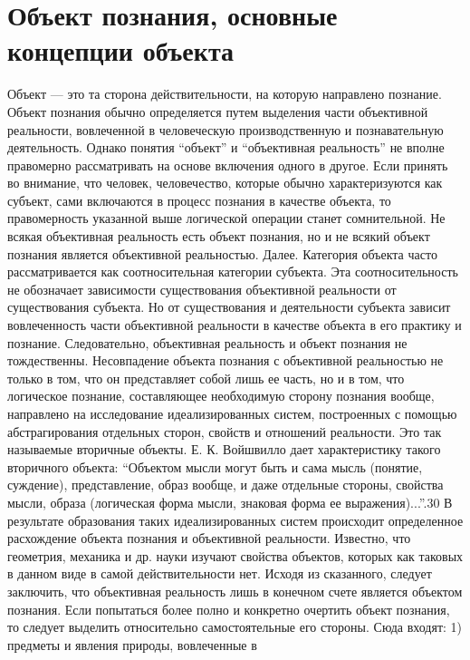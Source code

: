 \documentclass[12pt]{article}
\begin{document}
\newpage
\section{Объект познания, основные концепции объекта}
Объект — это та сторона действительности, на которую направлено познание.
Объект  познания  обычно  определяется  путем  выделения  части  объективной  реальности,  вовлеченной  в
человеческую производственную и познавательную деятельность. Однако понятия “объект” и “объективная
реальность” не вполне правомерно рассматривать на основе включения одного в другое. Если принять во
внимание,  что  человек,  человечество,  которые  обычно  характеризуются  как  субъект,  сами  включаются  в
процесс  познания  в  качестве  объекта,  то  правомерность  указанной  выше  логической  операции  станет
сомнительной.  Не  всякая  объективная  реальность  есть  объект  познания,  но  и  не  всякий  объект  познания
является объективной реальностью.
Далее.  Категория  объекта  часто  рассматривается  как  соотносительная  категории  субъекта.  Эта
соотносительность  не  обозначает  зависимости  существования  объективной  реальности  от  существования
субъекта. Но от существования и деятельности субъекта зависит вовлеченность части объективной реальности в
качестве объекта в его практику и познание. Следовательно, объективная реальность и объект познания не
тождественны.
Несовпадение объекта познания с объективной реальностью не только в том, что он представляет собой лишь
ее  часть,  но  и  в  том,  что  логическое  познание,  составляющее  необходимую  сторону  познания  вообще,
направлено на исследование идеализированных систем, построенных с помощью абстрагирования отдельных
сторон, свойств и отношений реальности. Это так называемые вторичные объекты. Е. К. Войшвилло дает
характеристику такого вторичного объекта: “Объектом мысли могут быть и сама мысль (понятие, суждение),
представление, образ вообще, и даже отдельные стороны, свойства мысли, образа (логическая форма мысли,
знаковая форма ее выражения)...”.30 В результате образования таких идеализированных систем происходит
определенное расхождение объекта познания и объективной реальности. Известно, что геометрия, механика и
др. науки изучают свойства объектов, которых как таковых в данном виде в самой действительности нет.
Исходя  из  сказанного,  следует  заключить,  что  объективная  реальность  лишь  в  конечном  счете  является
объектом познания. Если попытаться более полно и конкретно очертить объект познания, то следует выделить
относительно самостоятельные его стороны. Сюда входят: 1) предметы и явления природы, вовлеченные в
\end{document}
